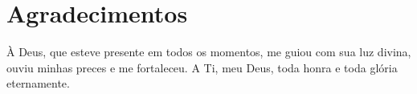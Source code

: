 \chapter*{Agradecimentos}
À Deus, que esteve presente em todos os momentos, me guiou com sua luz divina, ouviu minhas preces e me fortaleceu. A Ti, meu Deus, toda honra e toda glória eternamente.